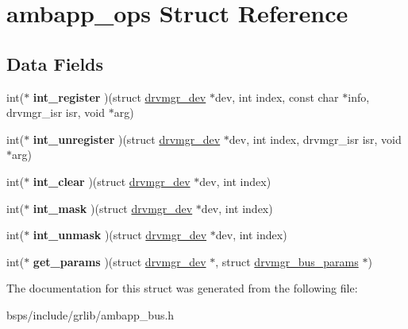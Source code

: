 \hypertarget{structambapp__ops}{}\section{ambapp\+\_\+ops Struct Reference}
\label{structambapp__ops}
\subsection*{Data Fields}
\begin{DoxyCompactItemize}
\item 
\mbox{\label{structambapp__ops_ab02f52e4803dd014aea54be622002bf3}} 
int($\ast$ {\bfseries int\+\_\+register} )(struct \mbox{\hyperlink{structdrvmgr__dev}{drvmgr\+\_\+dev}} $\ast$dev, int index, const char $\ast$info, drvmgr\+\_\+isr isr, void $\ast$arg)
\item 
\mbox{\label{structambapp__ops_ae3d5b920af5b5e307cfe17cafc4f33dc}} 
int($\ast$ {\bfseries int\+\_\+unregister} )(struct \mbox{\hyperlink{structdrvmgr__dev}{drvmgr\+\_\+dev}} $\ast$dev, int index, drvmgr\+\_\+isr isr, void $\ast$arg)
\item 
\mbox{\label{structambapp__ops_a62fab37f77cd107985fb7fd55a835fed}} 
int($\ast$ {\bfseries int\+\_\+clear} )(struct \mbox{\hyperlink{structdrvmgr__dev}{drvmgr\+\_\+dev}} $\ast$dev, int index)
\item 
\mbox{\label{structambapp__ops_a011b626b6b052f08404f9569fa679d3c}} 
int($\ast$ {\bfseries int\+\_\+mask} )(struct \mbox{\hyperlink{structdrvmgr__dev}{drvmgr\+\_\+dev}} $\ast$dev, int index)
\item 
\mbox{\label{structambapp__ops_af875d9754f29eff9b99bf89f29edae26}} 
int($\ast$ {\bfseries int\+\_\+unmask} )(struct \mbox{\hyperlink{structdrvmgr__dev}{drvmgr\+\_\+dev}} $\ast$dev, int index)
\item 
\mbox{\label{structambapp__ops_ac15c5f7a05b1ae85ee38d014252b163b}} 
int($\ast$ {\bfseries get\+\_\+params} )(struct \mbox{\hyperlink{structdrvmgr__dev}{drvmgr\+\_\+dev}} $\ast$, struct \mbox{\hyperlink{structdrvmgr__bus__params}{drvmgr\+\_\+bus\+\_\+params}} $\ast$)
\end{DoxyCompactItemize}


The documentation for this struct was generated from the following file\+:\begin{DoxyCompactItemize}
\item 
bsps/include/grlib/ambapp\+\_\+bus.\+h\end{DoxyCompactItemize}
